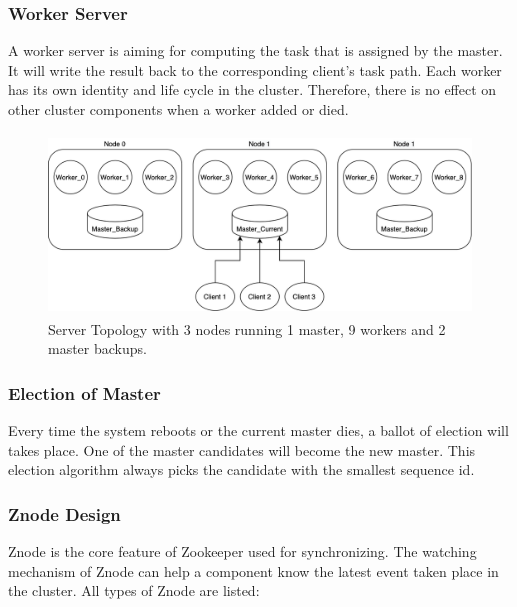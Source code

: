 \documentclass[runningheads,a4paper]{llncs}
\begin{document}
\subsubsection{Worker Server}

A worker server is aiming for computing the task that is assigned by the master. It will write the result back to the corresponding client's task path. Each worker has its own identity and life cycle in the cluster. Therefore, there is no effect on other cluster components when a worker added or died.


\begin{figure}[htbp]
\begin{center}
\includegraphics[height=4.8cm]{./ServerTopo.png}
\caption{Server Topology with 3 nodes running 1 master, 9 workers and 2 master backups.}
\label{Server Topology}
\end{center}
\end{figure}


\subsubsection{Election of Master}
Every time the system reboots or the current master dies, a ballot of election will takes place. One of the master candidates will become the new master. This election algorithm always picks the candidate with the smallest sequence id.



\subsubsection{Znode Design}
Znode is the core feature of Zookeeper used for synchronizing. The watching mechanism of Znode can help a component know the latest event taken place in the cluster. All types of Znode are listed:
\end{document}
